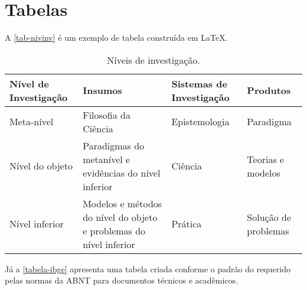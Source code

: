 \section{Tabelas}

A \autoref{tab-nivinv} é um exemplo de tabela construída em
\LaTeX.

\begin{table}[htb]
  \ABNTEXfontereduzida
  \caption[Níveis de investigação]{Níveis de investigação.}
  \label{tab-nivinv}
  \begin{tabular}{p{2.6cm}|p{6.0cm}|p{2.25cm}|p{3.40cm}}
    \textbf{Nível de Investigação} & \textbf{Insumos}                                                   & \textbf{Sistemas de Investigação} & \textbf{Produtos}    \\
    \hline
    Meta-nível                     & Filosofia\index{filosofia} da Ciência                              & Epistemologia                     &
    Paradigma                                                                                                                                                      \\
    \hline
    Nível do objeto                & Paradigmas do metanível e evidências do nível inferior             &
    Ciência                        & Teorias e modelos                                                                                                             \\
    \hline
    Nível inferior                 & Modelos e métodos do nível do objeto e problemas do nível inferior & Prática                           & Solução de problemas \\
  \end{tabular}
\end{table}

Já a \autoref{tabela-ibge} apresenta uma tabela criada conforme o padrão do
 requerido pelas normas da ABNT para documentos técnicos e
acadêmicos.

\begin{table}[htb]
\end{table}


